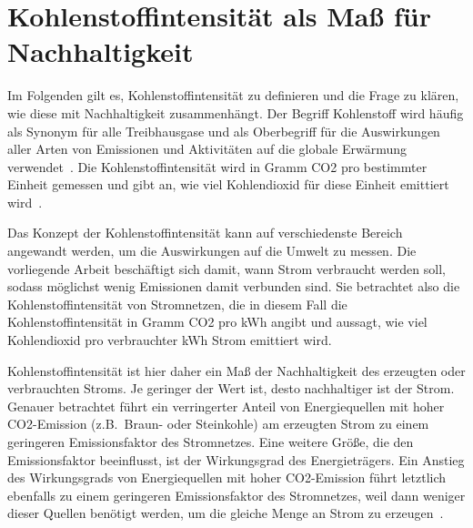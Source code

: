 \section{Kohlenstoffintensität als Maß für Nachhaltigkeit}\label{CAP:ci}
Im Folgenden gilt es, Kohlenstoffintensität zu definieren und die Frage zu klären, wie diese mit Nachhaltigkeit zusammenhängt.
Der Begriff Kohlenstoff wird häufig als Synonym für alle Treibhausgase und als Oberbegriff für die Auswirkungen aller Arten von Emissionen und Aktivitäten auf die globale Erwärmung verwendet~\cite{GreenSoftwareFoundation.2022}.
Die Kohlenstoffintensität wird in Gramm \ac{CO2} pro bestimmter Einheit gemessen und gibt an, wie viel Kohlendioxid für diese Einheit emittiert wird~\cite{LyndonRuff.20220420T15:34:17.000Z}.

Das Konzept der Kohlenstoffintensität kann auf verschiedenste Bereich angewandt werden, um die Auswirkungen auf die Umwelt zu messen.
Die vorliegende Arbeit beschäftigt sich damit, wann Strom verbraucht werden soll, sodass möglichst wenig Emissionen damit verbunden sind.
Sie betrachtet also die Kohlenstoffintensität von Stromnetzen, die in diesem Fall die Kohlenstoffintensität in Gramm \ac{CO2} pro \ac{kWh} angibt und aussagt, wie viel Kohlendioxid pro verbrauchter \ac{kWh} Strom emittiert wird.

Kohlenstoffintensität ist hier daher ein Maß der Nachhaltigkeit des erzeugten oder verbrauchten Stroms.
Je geringer der Wert ist, desto nachhaltiger ist der Strom.
Genauer betrachtet führt ein verringerter Anteil von Energiequellen mit hoher \ac{CO2}-Emission (z.B.\ Braun- oder Steinkohle) am erzeugten Strom zu einem geringeren Emissionsfaktor des Stromnetzes.
Eine weitere Größe, die den Emissionsfaktor beeinflusst, ist der Wirkungsgrad des Energieträgers.
Ein Anstieg des Wirkungsgrads von Energiequellen mit hoher \ac{CO2}-Emission führt letztlich ebenfalls zu einem geringeren Emissionsfaktor des Stromnetzes, weil dann weniger dieser Quellen benötigt werden, um die gleiche Menge an Strom zu erzeugen~\cite{Icha.2020}.

